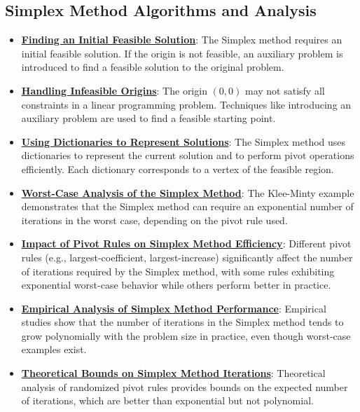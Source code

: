 \documentclass{article}%
\begin{document}
%
\subsection{Simplex Method Algorithms and Analysis}%
\label{subsec:SimplexMethodAlgorithmsandAnalysis}%
\begin{itemize}[leftmargin=*]%
\item \href{https://www.math.purdue.edu/~yipn/421//2024-08-27-ExSimplex.pdf#page=32}{\textbf{Finding an Initial Feasible Solution}}: The Simplex method requires an initial feasible solution.  If the origin is not feasible, an auxiliary problem is introduced to find a feasible solution to the original problem.%
\item \href{https://www.math.purdue.edu/~yipn/421//2024-08-27-ExSimplex.pdf#page=30}{\textbf{Handling Infeasible Origins}}: The origin $(0, 0)$ may not satisfy all constraints in a linear programming problem.  Techniques like introducing an auxiliary problem are used to find a feasible starting point.%
\item \href{https://www.math.purdue.edu/~yipn/421//2024-08-27-ExSimplex.pdf#page=26}{\textbf{Using Dictionaries to Represent Solutions}}: The Simplex method uses dictionaries to represent the current solution and to perform pivot operations efficiently.  Each dictionary corresponds to a vertex of the feasible region.%
\item \href{https://www.math.purdue.edu/~yipn/421//2024-09-05-SimplexEfficiency.pdf#page=2}{\textbf{Worst-Case Analysis of the Simplex Method}}: The Klee-Minty example demonstrates that the Simplex method can require an exponential number of iterations in the worst case, depending on the pivot rule used.%
\item \href{https://www.math.purdue.edu/~yipn/421//2024-09-05-SimplexEfficiency.pdf#page=3}{\textbf{Impact of Pivot Rules on Simplex Method Efficiency}}: Different pivot rules (e.g., largest-coefficient, largest-increase) significantly affect the number of iterations required by the Simplex method, with some rules exhibiting exponential worst-case behavior while others perform better in practice.%
\item \href{https://www.math.purdue.edu/~yipn/421//2024-09-05-SimplexEfficiency.pdf#page=9}{\textbf{Empirical Analysis of Simplex Method Performance}}: Empirical studies show that the number of iterations in the Simplex method tends to grow polynomially with the problem size in practice, even though worst-case examples exist.%
\item \href{https://www.math.purdue.edu/~yipn/421//2024-09-05-SimplexEfficiency.pdf#page=10}{\textbf{Theoretical Bounds on Simplex Method Iterations}}: Theoretical analysis of randomized pivot rules provides bounds on the expected number of iterations, which are better than exponential but not polynomial.%

\end{itemize}
\end{document}
